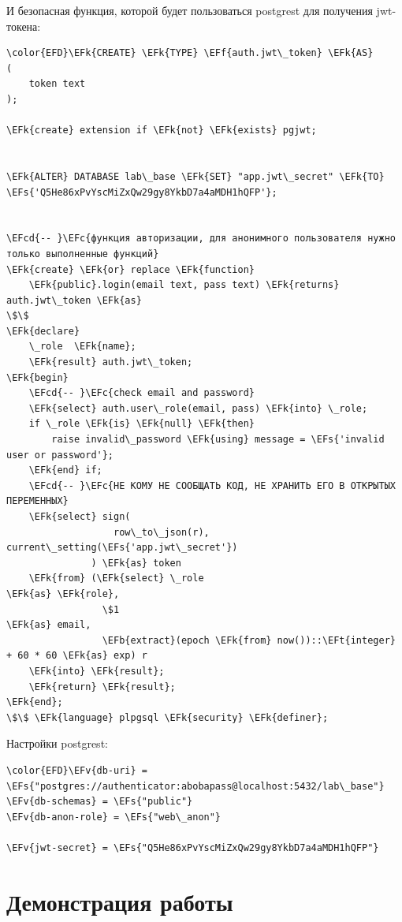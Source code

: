 \documentclass[14pt]{extarticle}
\newcommand{\EFc}[1]{\textcolor{EFc}{#1}} %
\newcommand{\EFcd}[1]{\textcolor{EFcd}{#1}} %
\newcommand{\EFs}[1]{\textcolor{EFs}{#1}} %
\newcommand{\EFk}[1]{\textcolor{EFk}{#1}} %
\newcommand{\EFb}[1]{\textcolor{EFb}{#1}} %
\newcommand{\EFf}[1]{\textcolor{EFf}{#1}} %
\newcommand{\EFv}[1]{\textcolor{EFv}{#1}} %
\newcommand{\EFt}[1]{\textcolor{EFt}{#1}} %
\begin{document}
И безопасная функция, которой будет пользоваться postgrest для получения jwt-токена:

\begin{Code}
\begin{Verbatim}
\color{EFD}\EFk{CREATE} \EFk{TYPE} \EFf{auth.jwt\_token} \EFk{AS}
(
    token text
);

\EFk{create} extension if \EFk{not} \EFk{exists} pgjwt;


\EFk{ALTER} DATABASE lab\_base \EFk{SET} "app.jwt\_secret" \EFk{TO} \EFs{'Q5He86xPvYscMiZxQw29gy8YkbD7a4aMDH1hQFP'};


\EFcd{-- }\EFc{функция авторизации, для анонимного пользователя нужно только выполненные функций}
\EFk{create} \EFk{or} replace \EFk{function}
    \EFk{public}.login(email text, pass text) \EFk{returns} auth.jwt\_token \EFk{as}
\$\$
\EFk{declare}
    \_role  \EFk{name};
    \EFk{result} auth.jwt\_token;
\EFk{begin}
    \EFcd{-- }\EFc{check email and password}
    \EFk{select} auth.user\_role(email, pass) \EFk{into} \_role;
    if \_role \EFk{is} \EFk{null} \EFk{then}
        raise invalid\_password \EFk{using} message = \EFs{'invalid user or password'};
    \EFk{end} if;
    \EFcd{-- }\EFc{НЕ КОМУ НЕ СООБЩАТЬ КОД, НЕ ХРАНИТЬ ЕГО В ОТКРЫТЫХ ПЕРЕМЕННЫХ}
    \EFk{select} sign(
                   row\_to\_json(r), current\_setting(\EFs{'app.jwt\_secret'})
               ) \EFk{as} token
    \EFk{from} (\EFk{select} \_role                                        \EFk{as} \EFk{role},
                 \$1                                           \EFk{as} email,
                 \EFb{extract}(epoch \EFk{from} now())::\EFt{integer} + 60 * 60 \EFk{as} exp) r
    \EFk{into} \EFk{result};
    \EFk{return} \EFk{result};
\EFk{end};
\$\$ \EFk{language} plpgsql \EFk{security} \EFk{definer};
\end{Verbatim}
\end{Code}




Настройки postgrest:
\begin{Code}
\begin{Verbatim}
\color{EFD}\EFv{db-uri} = \EFs{"postgres://authenticator:abobapass@localhost:5432/lab\_base"}
\EFv{db-schemas} = \EFs{"public"}
\EFv{db-anon-role} = \EFs{"web\_anon"}

\EFv{jwt-secret} = \EFs{"Q5He86xPvYscMiZxQw29gy8YkbD7a4aMDH1hQFP"}

\end{Verbatim}
\end{Code}

\section{Демонстрация работы}
\label{sec:org659a900}
\end{document}
